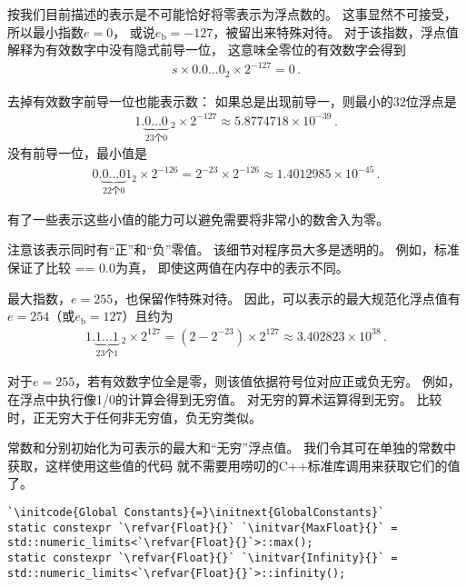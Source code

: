 按我们目前描述的表示是不可能恰好将零表示为浮点数的。
这事显然不可接受，所以最小指数$e=0$，
或说$e_{\mathrm{b}}=-127$，被留出来特殊对待。
对于该指数，浮点值解释为有效数字中没有隐式前导一位，
这意味全零位的有效数字会得到
\begin{align*}
    s\times0.0\ldots0_2\times2^{-127}=0\, .
\end{align*}

去掉有效数字前导一位也能表示数：
如果总是出现前导一，则最小的32位浮点是
\begin{align*}
    1.{\underbrace{0\ldots0}_{\text{23个0}}}\ _2\times2^{-127}\approx5.8774718\times10^{-39}\, .
\end{align*}
没有前导一位，最小值是
\begin{align*}
    0.\underbrace{0\ldots0}_{\text{22个0}}1_2\times2^{-126}=2^{-23}\times2^{-126}\approx1.4012985\times10^{-45}\, .
\end{align*}

有了一些表示这些小值的能力可以避免需要将非常小的数舍入为零。

注意该表示同时有“正”和“负”零值。
该细节对程序员大多是透明的。
例如，标准保证了比较{ == 0.0}为真，
即使这两值在内存中的表示不同。

最大指数，$e=255$，也保留作特殊对待。
因此，可以表示的最大规范化浮点值有$e=254$（或$e_{\mathrm{b}}=127$）且约为
\begin{align*}
    1.{\underbrace{1\ldots1}_{\text{23个1}}}\ _2\times2^{127}=(2-2^{-23})\times2^{127}\approx3.402823\times10^{38}\, .
\end{align*}

对于$e=255$，若有效数字位全是零，则该值依据符号位对应正或负无穷。
例如，在浮点中执行像1/0的计算会得到无穷值。
对无穷的算术运算得到无穷。
比较时，正无穷大于任何非无穷值，负无穷类似。

常数和分别初始化为可表示的最大和“无穷”浮点值。
我们令其可在单独的常数中获取，这样使用这些值的代码
就不需要用唠叨的C++标准库调用来获取它们的值了。
\begin{lstlisting}
`\initcode{Global Constants}{=}\initnext{GlobalConstants}`
static constexpr `\refvar{Float}{}` `\initvar{MaxFloat}{}` = std::numeric_limits<`\refvar{Float}{}`>::max();
static constexpr `\refvar{Float}{}` `\initvar{Infinity}{}` = std::numeric_limits<`\refvar{Float}{}`>::infinity();
\end{lstlisting}

